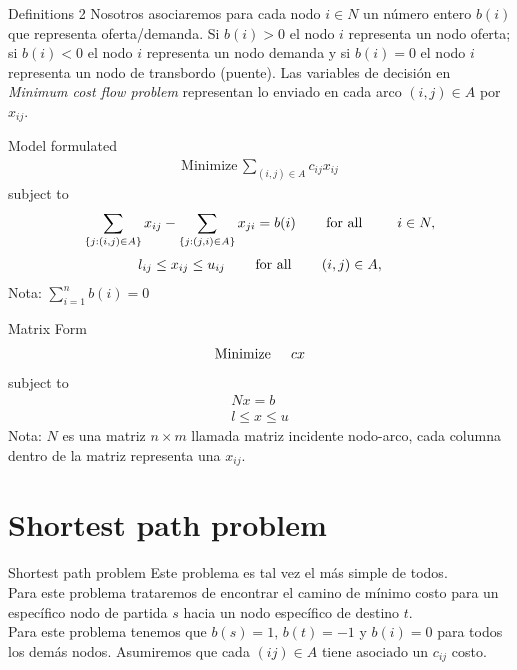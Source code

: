 \documentclass{beamer}
\begin{document}
\begin{frame}{Definitions 2}
Nosotros asociaremos para cada nodo $i \in N$ un número entero $b(i)$ que representa oferta/demanda. Si $b(i)>0$ el nodo $i$ representa un nodo oferta; si $b(i)<0$ el nodo $i$ representa un nodo demanda y si $b(i)=0$ el nodo $i$ representa un nodo de transbordo (puente). Las variables de decisión en \textit{Minimum cost flow problem} representan lo enviado en cada arco $(i,j) \in A$ por $x_{ij}$.  
\end{frame}

\begin{frame}{Model formulated}
 \begin{gather}
  \text{Minimize} \, \sum_{  (i,j) \in A  } {c_{ij}x_{ij}}
 \end{gather}
subject to
\begin{gather}
 \sum_{  \{j:(i,j) \in A\}  } {x_{ij}} - \sum_{  \{j:(j,i) \in A\}  } {x_{ji}} = b(i) \hspace{0.3 in} \text{for all } \hspace{0.3 in} i \in N,  
\end{gather}
\begin{gather}
 l_{ij} \leq x_{ij} \leq u_{ij} \hspace{0.3 in} \text{for all} \hspace{0.3 in} (i,j) \in A,
\end{gather}
Nota: $\displaystyle \sum_{i=1}^{n} b(i) = 0$

\end{frame}

\begin{frame}{Matrix Form}
\begin{gather}
 \text{Minimize} \hspace{0.2 in} cx
\end{gather}
subject to
\begin{gather}
 N x = b \\
 l \leq x \leq u
\end{gather}
Nota: $N$ es una matriz $n \times m$ llamada matriz incidente nodo-arco, cada columna dentro de la matriz representa una $x_{ij}$.
\end{frame}

\section{Shortest path problem}
\begin{frame}{Shortest path problem}
 Este problema es tal vez el más simple de todos.\\ Para este problema trataremos de encontrar el camino de mínimo costo para un específico nodo de partida $s$ hacia un nodo específico de destino $t$. \\
 Para este problema tenemos que $b(s) = 1, \, b(t)=-1$ y $b(i)=0$ para todos los demás nodos. \newline Asumiremos que cada $(ij) \in A$ tiene asociado un $c_{ij}$ costo.
\end{frame}
\end{document}
